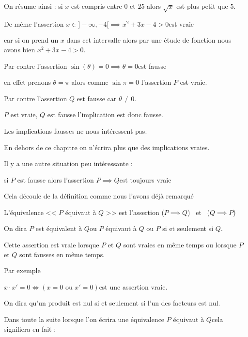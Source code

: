 On résume ainsi : si $x$ est compris entre $0$ et $25$ alors $\sqrt x$ est plus petit que $5$.

\change

De même l'assertion \og $x \in ]-\infty, -4[ \implies x^2+3x-4 > 0$\fg est vraie 

car si on prend un $x$ dans cet intervalle alors par une étude de fonction
nous avons  bien $x^2+3x-4 > 0$.

\change

Par contre 
l'assertion \og $\sin(\theta)=0 \implies \theta = 0$\fg est fausse 

en effet prenons $\theta=\pi$ alors 
comme $\sin \pi = 0$ l'assertion $P$ est vraie.

Par contre l'assertion $Q$ est fausse car $\theta \neq 0$.

$P$ est vraie, $Q$ est fausse l'implication est donc fausse.

Les implications fausses ne nous intéressent pas.


En dehors de ce chapitre on n'écrira plus que des implications vraies.


\change 

Il y a une autre situation peu intéressante :

 si $P$ est fausse alors l'assertion \og $P \implies Q$\fg est toujours vraie

Cela découle de la définition comme nous l'avons déjà remarqué




\diapo

L'équivalence << $P$ équivaut à $Q$ >>
est l'assertion \og ($P \implies Q$) \  et \  ($Q \implies P$)\fg

On dira \og $P$ est équivalent à $Q$\fg  ou \og $P$ équivaut à $Q$\fg 
ou \og $P$ si et seulement si $Q$\fg.


\change

Cette assertion est vraie
lorsque $P$ et $Q$ sont vraies en même temps ou lorsque $P$ et $Q$ sont fausses en même temps.

\change

Par exemple

\og $x\cdot x'=0 \iff (x=0 \text{ ou } x'=0)$\fg est une assertion vraie.

On dira qu'un produit est nul si et seulement si l'un des facteurs est nul.



Dans toute la suite lorsque l'on écrira une équivalence
\og $P$ équivaut à $Q$\fg cela signifiera en fait :

